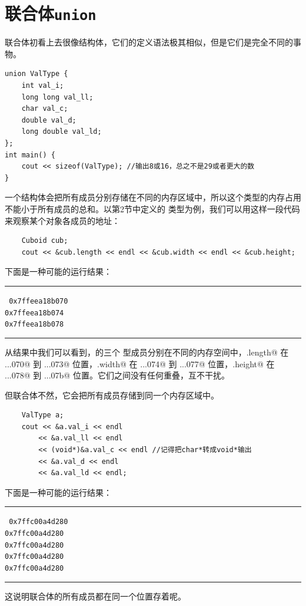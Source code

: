 \section{联合体\texttt{union}}
联合体初看上去很像结构体，它们的定义语法极其相似，但是它们是完全不同的事物。
\begin{lstlisting}
union ValType {
    int val_i;
    long long val_ll;
    char val_c;
    double val_d;
    long double val_ld;
};
int main() {
    cout << sizeof(ValType); //输出8或16，总之不是29或者更大的数
}
\end{lstlisting}
一个结构体会把所有成员分别存储在不同的内存区域中，所以这个类型的内存占用不能小于所有成员的总和。以第2节中定义的 \lstinline@Cuboid@ 类型为例，我们可以用这样一段代码来观察某个对象各成员的地址：
\begin{lstlisting}
    Cuboid cub;
    cout << &cub.length << endl << &cub.width << endl << &cub.height;
\end{lstlisting}
下面是一种可能的运行结果：\\\noindent\rule{\linewidth}{.2pt}\texttt{
0x7ffeea18b070\\
0x7ffeea18b074\\
0x7ffeea18b078
}\\\noindent\rule{\linewidth}{.2pt}\par
从结果中我们可以看到，\lstinline@cub@ 的三个 \lstinline@int@ 型成员分别在不同的内存空间中，\lstinline@cub.length@ 在 \lstinline@...070@ 到 \lstinline@...073@ 位置，\lstinline@cub.width@ 在 \lstinline@...074@ 到 \lstinline@...077@ 位置，\lstinline@cub.height@ 在 \lstinline@...078@ 到 \lstinline@...07b@ 位置。它们之间没有任何重叠，互不干扰。\par
但联合体不然，它会把所有成员存储到同一个内存区域中。
\begin{lstlisting}
    ValType a;
    cout << &a.val_i << endl
        << &a.val_ll << endl
        << (void*)&a.val_c << endl //记得把char*转成void*输出
        << &a.val_d << endl
        << &a.val_ld << endl;
\end{lstlisting}
下面是一种可能的运行结果：\\\noindent\rule{\linewidth}{.2pt}\texttt{
0x7ffc00a4d280\\
0x7ffc00a4d280\\
0x7ffc00a4d280\\
0x7ffc00a4d280\\
0x7ffc00a4d280
}\\\noindent\rule{\linewidth}{.2pt}
这说明联合体的所有成员都在同一个位置存着呢。\par
